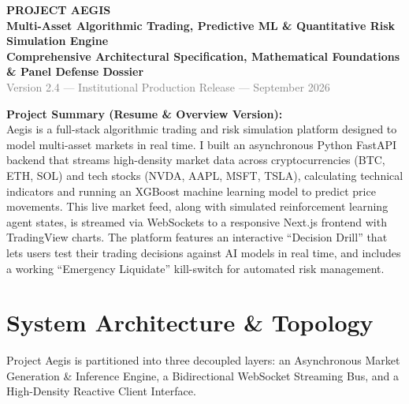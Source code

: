 \documentclass[11pt,a4paper]{article}
\begin{document}
\begin{center}
  {\Huge \textbf{PROJECT AEGIS}} \\[0.5em]
  {\Large \textbf{Multi-Asset Algorithmic Trading, Predictive ML \& Quantitative Risk Simulation Engine}} \\[0.5em]
  {\normalsize \textbf{Comprehensive Architectural Specification, Mathematical Foundations \& Panel Defense Dossier}} \\[0.8em]
  \textcolor{gray}{\small Version 2.4 --- Institutional Production Release --- September 2026}
\end{center}

\vspace{0.5em}

\begin{summarybox}
\textbf{\large Project Summary (Resume \& Overview Version):} \\[0.4em]
Aegis is a full-stack algorithmic trading and risk simulation platform designed to model multi-asset markets in real time. I built an asynchronous Python FastAPI backend that streams high-density market data across cryptocurrencies (BTC, ETH, SOL) and tech stocks (NVDA, AAPL, MSFT, TSLA), calculating technical indicators and running an XGBoost machine learning model to predict price movements. This live market feed, along with simulated reinforcement learning agent states, is streamed via WebSockets to a responsive Next.js frontend with TradingView charts. The platform features an interactive ``Decision Drill'' that lets users test their trading decisions against AI models in real time, and includes a working ``Emergency Liquidate'' kill-switch for automated risk management.
\end{summarybox}

\vspace{1em}

\section{System Architecture \& Topology}

Project Aegis is partitioned into three decoupled layers: an Asynchronous Market Generation \& Inference Engine, a Bidirectional WebSocket Streaming Bus, and a High-Density Reactive Client Interface.
\end{document}
